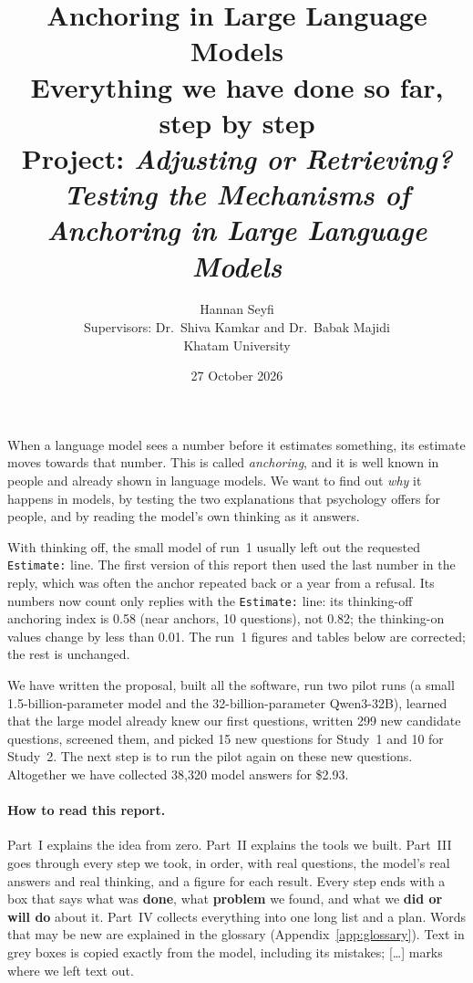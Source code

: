 \documentclass[11pt,a4paper]{article}
\title{\textbf{Anchoring in Large Language Models}\\[4pt]
\large Everything we have done so far, step by step\\[2pt]
\normalsize Project: \emph{Adjusting or Retrieving? Testing the Mechanisms of Anchoring in Large Language Models}}
\author{Hannan Seyfi\\[6pt]
\normalsize Supervisors: Dr.\ Shiva Kamkar and Dr.\ Babak Majidi\\
\normalsize Khatam University}
\date{27 October 2026}
\newcommand{\cut}{\textup{[\dots]}}
\begin{document}
\maketitle

\begin{keybox}
When a language model sees a number before it estimates something, its estimate moves towards that number. This is called \emph{anchoring}, and it is well known in people and already shown in language models. We want to find out \emph{why} it happens in models, by testing the two explanations that psychology offers for people, and by reading the model's own thinking as it answers.
\end{keybox}

\begin{keybox}
With thinking off, the small model of run~1 usually left out the requested \texttt{Estimate:} line. The first version of this report then used the last number in the reply, which was often the anchor repeated back or a year from a refusal. Its numbers now count only replies with the \texttt{Estimate:} line: its thinking-off anchoring index is 0.58 (near anchors, 10 questions), not 0.82; the thinking-on values change by less than 0.01. The run~1 figures and tables below are corrected; the rest is unchanged.
\end{keybox}

\begin{keybox}
We have written the proposal, built all the software, run two pilot runs (a small 1.5-billion-parameter model and the 32-billion-parameter Qwen3-32B), learned that the large model already knew our first questions, written 299 new candidate questions, screened them, and picked 15 new questions for Study~1 and 10 for Study~2. The next step is to run the pilot again on these new questions. Altogether we have collected 38,320 model answers for \$2.93.
\end{keybox}

\paragraph{How to read this report.} Part~I explains the idea from zero. Part~II explains the tools we built. Part~III goes through every step we took, in order, with real questions, the model's real answers and real thinking, and a figure for each result. Every step ends with a box that says what was \textcolor{donecol}{\textbf{done}}, what \textcolor{probcol}{\textbf{problem}} we found, and what we \textcolor{nextcol}{\textbf{did or will do}} about it. Part~IV collects everything into one long list and a plan. Words that may be new are explained in the glossary (Appendix~\ref{app:glossary}). Text in grey boxes is copied exactly from the model, including its mistakes; \cut{} marks where we left text out.
\end{document}
